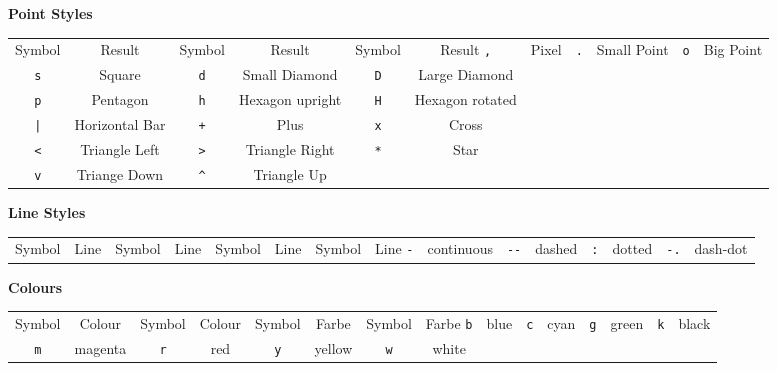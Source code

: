 
\begin{frame}
%
\begin{tcolorbox}[title=Format-Strings für \texttt{plt.plot(X, Y, "style")}]
\scriptsize
\textbf{Point Styles}
\begin{center}
	\begin{tabular}{cc|cc|cc}
		Symbol     & Result         & Symbol                    & Result           & Symbol     & Result           \tabcrlf
		\texttt{,} & Pixel          & \texttt{.}                & Small Point      & \texttt{o} & Big Point        \\
		\texttt{s} & Square         & \texttt{d}                & Small Diamond    & \texttt{D} & Large Diamond    \\
		\texttt{p} & Pentagon       & \texttt{h}                & Hexagon upright  & \texttt{H} & Hexagon rotated  \\
		\texttt{|} & Horizontal Bar & \texttt{+}                & Plus             & \texttt{x} & Cross            \\
		\texttt{<} & Triangle Left  & \texttt{>}                & Triangle Right   & \texttt{*} & Star             \\
		\texttt{v} & Triange Down   & \texttt{\textasciicircum} & Triangle Up                                      \\
	\end{tabular}
\end{center}

\textbf{Line Styles}
\begin{center}
	\begin{tabular}{cc|cc|cc|cc}
		Symbol     & Line         & Symbol        & Line     & Symbol     & Line     & Symbol      & Line    \tabcrlf
		\texttt{-} & continuous   & \texttt{-{}-} & dashed   & \texttt{:} & dotted   & \texttt{-.} & dash-dot \\
	\end{tabular}
\end{center}
%
\textbf{Colours}
\begin{center}
	\begin{tabular}{cc|cc|cc|cc}
		Symbol     & Colour  & Symbol     & Colour  & Symbol     & Farbe  & Symbol     & Farbe  \tabcrlf
		\texttt{b} & blue    & \texttt{c} & cyan    & \texttt{g} & green  & \texttt{k} & black  \\
		\texttt{m} & magenta & \texttt{r} & red     & \texttt{y} & yellow & \texttt{w} & white  \\
	\end{tabular}
\end{center}
\end{tcolorbox}
%
\end{frame}

